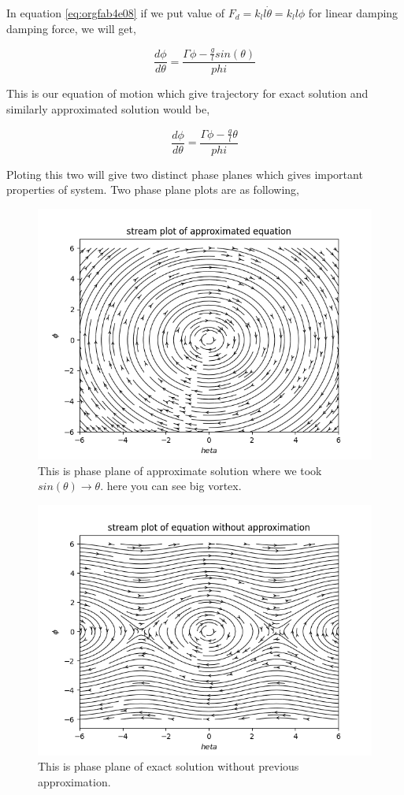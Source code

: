 \documentclass{article}
\begin{document}
In equation \ref{eq:orgfab4e08} if we put value of \(F_{d} = k_{l}l\dot{\theta} = k_{l}l\phi\) for linear damping damping force, we will get,

\begin{equation}
\label{eq:org3af6856}
\frac{d\phi}{d\theta}=\frac{\Gamma\phi-\frac{g}{l}sin(\theta)}{phi}
\end{equation}

This is our equation of motion which give trajectory for exact solution and similarly approximated solution would be,

\begin{equation}
\label{eq:org7e12b82}
\frac{d\phi}{d\theta}=\frac{\Gamma\phi-\frac{g}{l}\theta}{phi}
\end{equation}

Ploting this two will give two distinct phase planes which gives important properties of system. Two phase plane plots are as following, 


\begin{figure}[htbp]
\centering
\includegraphics[width=0.8 \textwidth]{../graphs/approlstr.png}
\caption{\label{fig:orga1e78aa}This is phase plane of approximate solution where we took \(sin(\theta) \to \theta\). here you can see big vortex.}
\end{figure}

\begin{figure}[htbp]
\centering
\includegraphics[width=0.8 \textwidth]{../graphs/exactlstr.png}
\caption{\label{fig:org19e11b6}This is phase plane of exact solution without previous approximation.}
\end{figure}
\end{document}
